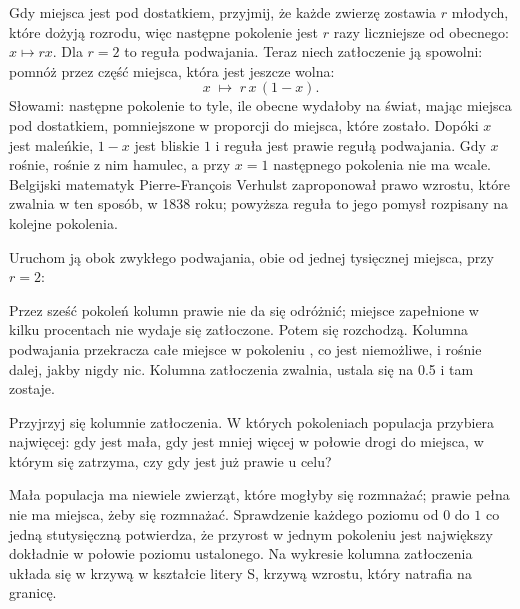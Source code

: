 Gdy miejsca jest pod dostatkiem, przyjmij, że każde zwierzę zostawia $r$
młodych, które dożyją rozrodu, więc następne pokolenie jest $r$ razy
liczniejsze od obecnego: $x \mapsto r x$. Dla $r = 2$ to reguła podwajania.
Teraz niech zatłoczenie ją spowolni: pomnóż przez część miejsca, która jest
jeszcze wolna:
\[ x \;\mapsto\; r\,x\,(1 - x). \]
Słowami: następne pokolenie to tyle, ile obecne wydałoby na świat, mając
miejsca pod dostatkiem, pomniejszone w proporcji do miejsca, które zostało.
Dopóki $x$ jest maleńkie, $1 - x$ jest bliskie $1$ i reguła jest prawie
regułą podwajania. Gdy $x$ rośnie, rośnie z nim hamulec, a przy $x = 1$
następnego pokolenia nie ma wcale. Belgijski matematyk Pierre-François
Verhulst zaproponował prawo wzrostu, które zwalnia w ten sposób, w 1838
roku; powyższa reguła to jego pomysł rozpisany na kolejne pokolenia.


\noindent
Uruchom ją obok zwykłego podwajania, obie od jednej tysięcznej miejsca, przy
$r = 2$:



\noindent
Przez sześć pokoleń kolumn prawie nie da się odróżnić; miejsce zapełnione w
kilku procentach nie wydaje się zatłoczone. Potem się rozchodzą. Kolumna
podwajania przekracza całe miejsce w pokoleniu , co jest
niemożliwe, i rośnie dalej, jakby nigdy nic. Kolumna zatłoczenia zwalnia,
ustala się na \num{0.5} i tam zostaje.

\begin{think}
Przyjrzyj się kolumnie zatłoczenia. W których pokoleniach populacja
przybiera najwięcej: gdy jest mała, gdy jest mniej więcej w połowie drogi do
miejsca, w którym się zatrzyma, czy gdy jest już prawie u celu?
\end{think}
Mała populacja ma niewiele zwierząt, które mogłyby się rozmnażać; prawie
pełna nie ma miejsca, żeby się rozmnażać. Sprawdzenie każdego poziomu od $0$
do $1$ co jedną stutysięczną potwierdza, że przyrost w jednym pokoleniu jest
największy dokładnie w połowie poziomu ustalonego. Na wykresie kolumna
zatłoczenia układa się w krzywą w kształcie litery S, krzywą wzrostu, który
natrafia na granicę.

